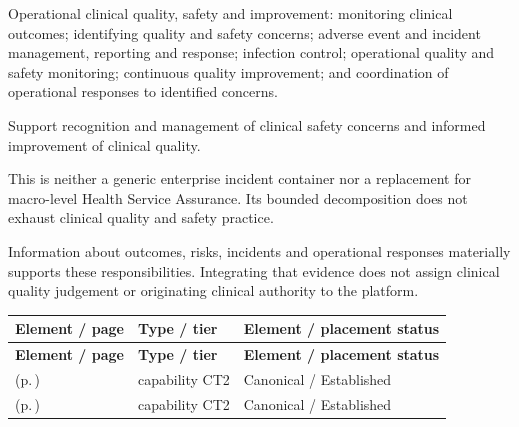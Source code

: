 
Operational clinical quality, safety and improvement: monitoring clinical outcomes; identifying quality and safety concerns; adverse event and incident management, reporting and response; infection control; operational quality and safety monitoring; continuous quality improvement; and coordination of operational responses to identified concerns.



Support recognition and management of clinical safety concerns and informed improvement of clinical quality.



This is neither a generic enterprise incident container nor a replacement for macro-level Health Service Assurance. Its bounded decomposition does not exhaust clinical quality and safety practice.



Information about outcomes, risks, incidents and operational responses materially supports these responsibilities. Integrating that evidence does not assign clinical quality judgement or originating clinical authority to the platform.


\begingroup\small\setlength{\TableWidth}{\dimexpr\linewidth-6\tabcolsep-4\arrayrulewidth\relax}
\begin{longtable}{|>{\raggedright\arraybackslash}p{0.52\TableWidth}|>{\raggedright\arraybackslash}p{0.2\TableWidth}|>{\raggedright\arraybackslash}p{0.28\TableWidth}|}
\hline\rowcolor{TableHead}\textbf{Element / page} & \textbf{Type / tier} & \textbf{Element / placement status}\\\hline\endfirsthead
\hline\rowcolor{TableHead}\textbf{Element / page} & \textbf{Type / tier} & \textbf{Element / placement status}\\\hline\endhead
\hline\endfoot
\nameref{cap:bc-clinical-safety-management} (p.\,\pageref{cap:bc-clinical-safety-management}) & capability CT2 & Canonical / Established\\\hline
\nameref{cap:bc-clinical-quality-management} (p.\,\pageref{cap:bc-clinical-quality-management}) & capability CT2 & Canonical / Established\\\hline
\end{longtable}\endgroup

